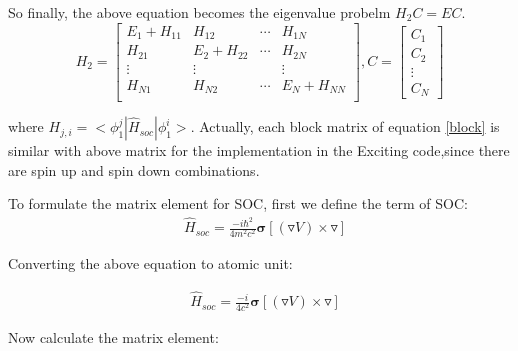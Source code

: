 \documentclass[a4paper]{report}
\begin{document}
\noindent So finally, the above equation becomes the eigenvalue probelm $H_2 C = E C$.
\begin{equation}\label{ep4}
H_2=\left[
\begin{matrix}
    E_1+H_{11} & H_{12} & \cdots & H_{1N} \\
    H_{21} & E_2 + H_{22} & \cdots & H_{2N} \\
    \vdots               & \vdots               &        & \vdots               \\
     H_{N1} & H_{N2} & \cdots & E_{N}+H_{NN} \\
\end{matrix} \right],
C = \left[ \begin{array}{c} C_1 \\ C_2 \\ \vdots \\ C_N\end{array} \right]
\end{equation}

\noindent where $H_{j,i} = <\phi^{j}_1 |\widehat{H}_{soc} | \phi^{i}_1  > $. Actually, each block matrix of equation \ref{block} is similar with above matrix 
for the implementation in the Exciting code,since there are spin up and spin down combinations. 

\noindent  To formulate the matrix element for SOC, first we define the \hm term of SOC:
\begin{equation}
\begin{split}
 & \widehat{H}_{soc} = \frac{-i\hbar^2}{4m^2c^2} \boldsymbol{\sigma} [ (\triangledown V) \times \triangledown]
\end{split}
\end{equation}

\noindent Converting the above equation to atomic unit:

\begin{equation}
\begin{split}
 & \widehat{H}_{soc} = \frac{-i}{4 c^2} \boldsymbol{\sigma} [ (\triangledown V) \times \triangledown]
\end{split}
\end{equation}

\noindent Now calculate the matrix element:
\end{document}
